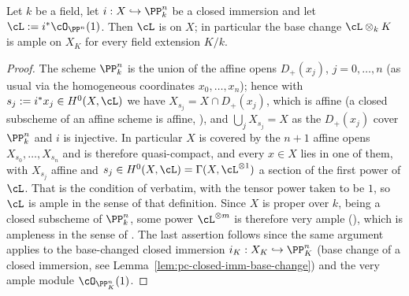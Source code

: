 \begin{lemma}
\label{lem:pc-very-ample-ample}
Let $k$ be a field, let $i:X\hookrightarrow\PP^n_k$ be a closed immersion
and let $\cL:=i^*\cO_{\PP^n}(1)$.  Then $\cL$ is
 on $X$; in particular the base change
$\cL\otimes_k K$ is ample on $X_K$ for every field extension $K/k$.
\end{lemma}
\begin{proof}
The scheme $\PP^n_k$ is the union of the affine opens $D_+(x_j)$,
$j=0,\dots,n$ (as usual via the homogeneous coordinates $x_0,\dots,x_n$);
hence with $s_j:=i^*x_j\in H^0(X,\cL)$ we have
$X_{s_j}=X\cap D_+(x_j)$, which is affine (a closed subscheme of an
affine scheme is affine, ),
and $\bigcup_jX_{s_j}=X$ as the $D_+(x_j)$ cover $\PP^n_k$ and $i$ is
injective.  In particular $X$ is covered by the $n+1$ affine opens
$X_{s_0},\dots,X_{s_n}$ and is therefore quasi-compact, and every
$x\in X$ lies in one of them, with $X_{s_j}$ affine and
$s_j\in H^0(X,\cL)=\Gamma(X,\cL^{\otimes1})$ a section of the first
power of $\cL$.  That is the condition of 
verbatim, with the tensor power taken to be $1$, so $\cL$ is ample in
the sense of that definition.  Since $X$ is proper over
$k$, being a closed subscheme of $\PP^n_k$, some power
$\cL^{\otimes m}$ is therefore very ample
(), which is ampleness in the
sense of .  The last
assertion follows since the same argument
applies to the base-changed closed immersion
$i_K:X_K\hookrightarrow\PP^n_K$ (base change of a closed immersion, see
Lemma~\ref{lem:pc-closed-imm-base-change})
and the very ample module $\cO_{\PP^n_K}(1)$.
\end{proof}

